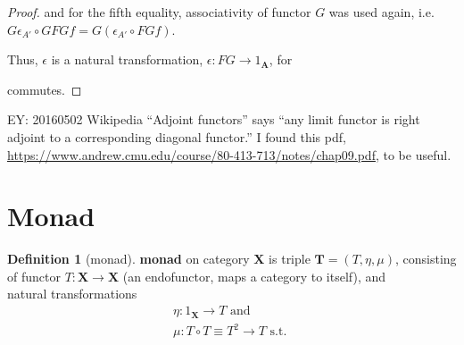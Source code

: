 \documentclass[twoside,landscape,10pt]{amsart}
\theoremstyle{plain}
\theoremstyle{definition}
\newtheorem{definition}{Definition}
\theoremstyle{remark}
\begin{document}
\begin{multicols*}{2}
\begin{proof}
and for the fifth equality, associativity of functor $G$ was used again, i.e. $G\epsilon_{A'} \circ GFGf = G(\epsilon_{A'} \circ FGf)$.  

Thus, $\epsilon$ is a natural transformation, $\epsilon :FG \to 1_{\mathbf{A}}$, for 


commutes.



\end{proof}

EY: 20160502 Wikipedia ``Adjoint functors'' says ``any limit functor is right adjoint to a corresponding diagonal functor.''  I found this pdf, \url{https://www.andrew.cmu.edu/course/80-413-713/notes/chap09.pdf}, to be useful.






\section{Monad}

\begin{definition}[monad]
  \textbf{monad} on category $\mathbf{X}$ is triple $\mathbf{T} = (T,\eta, \mu)$, consisting of  functor $T: \mathbf{X} \to \mathbf{X}$ (an endofunctor, maps a category to itself), and \\
natural transformations
\[
\begin{gathered}
  \eta : 1_{\mathbf{X}} \to T \text{ and } \\
  \mu : T \circ T \equiv T^2 \to T \text{ s.t. } 
\end{gathered}
\]


\end{definition}
\end{multicols*}
\end{document}
